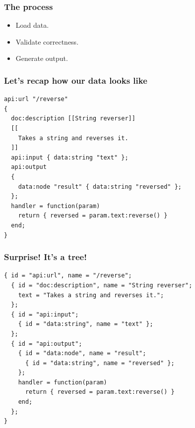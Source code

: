 \documentclass[handout]{beamer}
\begin{document}

\begin{frame}

\frametitle{The process}

\begin{itemize}
\item Load data.
\item Validate correctness.
\item Generate output.
\end{itemize}

\end{frame}


\begin{frame}[fragile]

\frametitle{Let's recap how our data looks like}

\begin{verbatim}
api:url "/reverse"
{
  doc:description [[String reverser]]
  [[
    Takes a string and reverses it.
  ]]
  api:input { data:string "text" };
  api:output
  {
    data:node "result" { data:string "reversed" };
  };
  handler = function(param)
    return { reversed = param.text:reverse() }
  end;
}
\end{verbatim}

\end{frame}


\begin{frame}[fragile]

\frametitle{Surprise! It's a tree!}

\begin{verbatim}
{ id = "api:url", name = "/reverse";
  { id = "doc:description", name = "String reverser";
    text = "Takes a string and reverses it.";
  };
  { id = "api:input";
    { id = "data:string", name = "text" };
  };
  { id = "api:output";
    { id = "data:node", name = "result";
      { id = "data:string", name = "reversed" };
    };
    handler = function(param)
      return { reversed = param.text:reverse() }
    end;
  };
}
\end{verbatim}

\end{frame}

\end{document}
